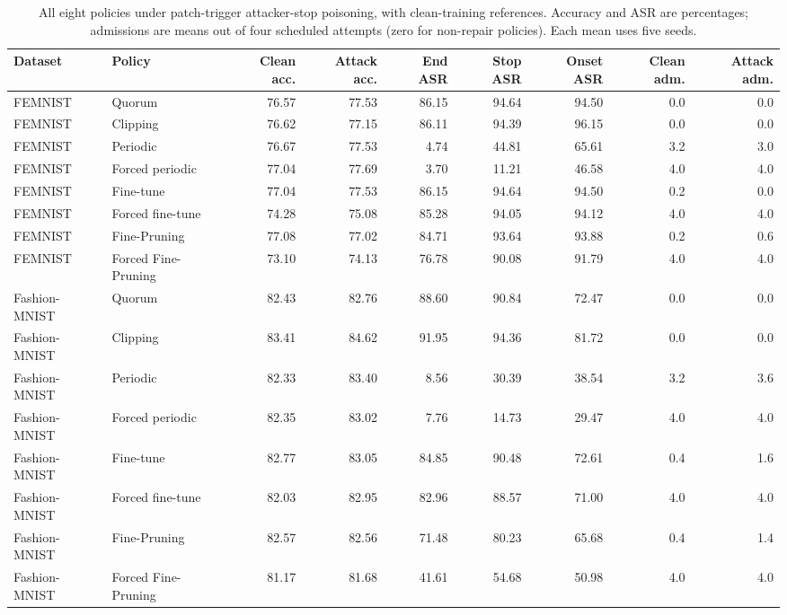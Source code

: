 \begin{table}[t]
\caption{All eight policies under patch-trigger attacker-stop poisoning, with clean-training references. Accuracy and ASR are percentages; admissions are means out of four scheduled attempts (zero for non-repair policies). Each mean uses five seeds.}
\label{tab:stop}
\centering\small\begin{tabular}{llrrrrrrr}
\toprule
Dataset & Policy & Clean acc. & Attack acc. & End ASR & Stop ASR & Onset ASR & Clean adm. & Attack adm. \\
\midrule
FEMNIST & Quorum & 76.57 & 77.53 & 86.15 & 94.64 & 94.50 & 0.0 & 0.0 \\
FEMNIST & Clipping & 76.62 & 77.15 & 86.11 & 94.39 & 96.15 & 0.0 & 0.0 \\
FEMNIST & Periodic & 76.67 & 77.53 & 4.74 & 44.81 & 65.61 & 3.2 & 3.0 \\
FEMNIST & Forced periodic & 77.04 & 77.69 & 3.70 & 11.21 & 46.58 & 4.0 & 4.0 \\
FEMNIST & Fine-tune & 77.04 & 77.53 & 86.15 & 94.64 & 94.50 & 0.2 & 0.0 \\
FEMNIST & Forced fine-tune & 74.28 & 75.08 & 85.28 & 94.05 & 94.12 & 4.0 & 4.0 \\
FEMNIST & Fine-Pruning & 77.08 & 77.02 & 84.71 & 93.64 & 93.88 & 0.2 & 0.6 \\
FEMNIST & Forced Fine-Pruning & 73.10 & 74.13 & 76.78 & 90.08 & 91.79 & 4.0 & 4.0 \\
Fashion-MNIST & Quorum & 82.43 & 82.76 & 88.60 & 90.84 & 72.47 & 0.0 & 0.0 \\
Fashion-MNIST & Clipping & 83.41 & 84.62 & 91.95 & 94.36 & 81.72 & 0.0 & 0.0 \\
Fashion-MNIST & Periodic & 82.33 & 83.40 & 8.56 & 30.39 & 38.54 & 3.2 & 3.6 \\
Fashion-MNIST & Forced periodic & 82.35 & 83.02 & 7.76 & 14.73 & 29.47 & 4.0 & 4.0 \\
Fashion-MNIST & Fine-tune & 82.77 & 83.05 & 84.85 & 90.48 & 72.61 & 0.4 & 1.6 \\
Fashion-MNIST & Forced fine-tune & 82.03 & 82.95 & 82.96 & 88.57 & 71.00 & 4.0 & 4.0 \\
Fashion-MNIST & Fine-Pruning & 82.57 & 82.56 & 71.48 & 80.23 & 65.68 & 0.4 & 1.4 \\
Fashion-MNIST & Forced Fine-Pruning & 81.17 & 81.68 & 41.61 & 54.68 & 50.98 & 4.0 & 4.0 \\
\bottomrule\end{tabular}
\end{table}
